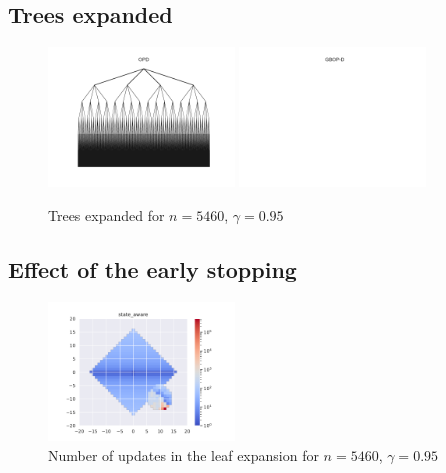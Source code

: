 \documentclass[runningheads]{llncs}
\begin{document}
\subsection{Trees expanded}
\begin{figure}[H]
	\centering
	\includegraphics[width=0.44\textwidth]{img/tree_OPD.pdf}
	\includegraphics[width=0.44\textwidth]{img/tree_GBOP-D.pdf}
	\caption{Trees expanded for $n = 5460$, $\gamma=0.95$}
	\label{fig:trees_expanded}
\end{figure}

\subsection{Effect of the early stopping}

\begin{figure}[H]
	\centering
	\includegraphics[width=0.44\textwidth]{img/updates_GBOP-D.pdf}
	\caption{Number of updates in the leaf expansion for $n = 5460$, $\gamma=0.95$}
	\label{fig:gw4_updates}
\end{figure}
\end{document}
